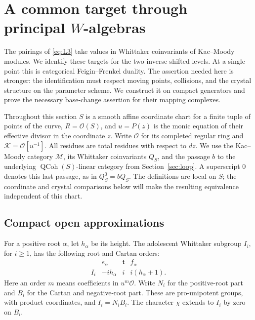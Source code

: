 \section{A common target through principal \texorpdfstring{\(W\)}{W}-algebras}\label{sec:walg}

The pairings of \eqref{eq:L3} take values in Whittaker coinvariants of
Kac--Moody modules.  We identify these targets for the two inverse shifted
levels.  At a single point this is categorical Feigin--Frenkel duality.
The assertion needed here is stronger: the identification must respect
moving points, collisions, and the crystal structure on the parameter
scheme.  We construct it on compact generators and prove the necessary
base-change assertion for their mapping complexes.

Throughout this section \(S\) is a smooth affine coordinate chart for a
finite tuple of points of the curve, \(R=\mathcal O(S)\), and \(u=P(z)\)
is the monic equation of their effective divisor in the coordinate
\(z\).  Write \(\mathcal O\) for its completed regular ring and
\(\mathcal K=\mathcal O[u^{-1}]\).  All residues are total residues with
respect to \(dz\).  We use the Kac--Moody category \(\mathcal M\), its
Whittaker coinvariants \(Q_S\), and the passage \(b\) to the underlying
\(\operatorname{QCoh}(S)\)-linear category from Section~\ref{sec:loop}.
A superscript \(0\) denotes this last passage, as in \(Q_S^0=bQ_S\).
The definitions are local on \(S\); the coordinate and crystal comparisons
below will make the resulting equivalence independent of this chart.

\subsection{Compact open approximations}

For a positive root \(\alpha\), let \(h_\alpha\) be its height.  The
adolescent Whittaker subgroup \(I_i\), for \(i\geq1\), has the following
root and Cartan orders:
\begin{equation}\label{eq:L4}
\begin{array}{c|ccc}
 &e_\alpha&\mathfrak t&f_\alpha\\ \hline
 I_i&-i h_\alpha&i&i(h_\alpha+1).
\end{array}
\end{equation}
Here an order \(m\) means coefficients in \(u^m\mathcal O\).
Write \(N_i\) for the positive-root part and \(B_i\) for the
Cartan and negative-root part.  These are pro-unipotent groups, with
product coordinates, and \(I_i=N_iB_i\).  The character \(\chi\)
extends to \(I_i\) by zero on \(B_i\).

